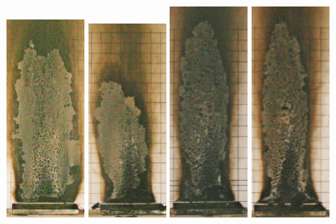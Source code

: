 \documentclass[twoside]{uocthesis}
\begin{document}
\begin{figure}[p]
	\includegraphics[width=1.0in]{../Figures/GBGAS_23_IMG_6048}
	\includegraphics[width=1.0in]{../Figures/GBGAS_26_IMG_6192}
	\includegraphics[width=1.0in]{../Figures/GBGAS_27_IMG_6210}
	\includegraphics[width=1.0in]{../Figures/GBGAS_28_IMG_6230}

\end{figure}
\end{document}
